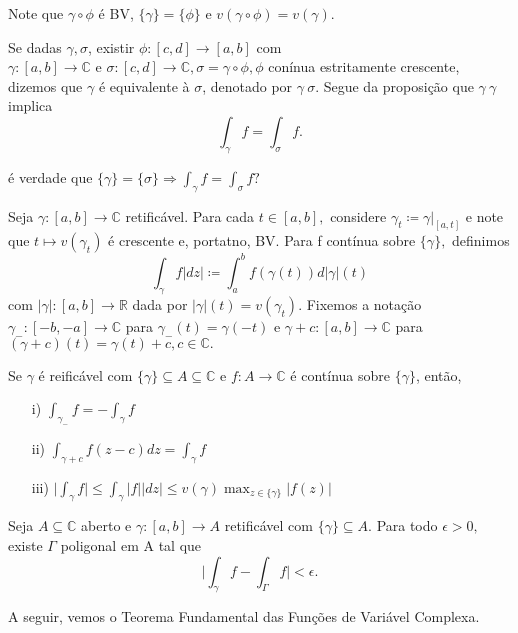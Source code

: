 \documentclass[ComplexAnalysis/complex.tex]{subfiles}
\begin{document}
\begin{proof*}
	\begin{exer*}
		Note que $\gamma\circ{\phi}$ é BV, $\{\gamma\}=\{\phi\} $ e $v(\gamma\circ{\phi}) = v(\gamma).$
	\end{exer*}
\end{proof*}
Se dadas $\gamma, \sigma$, existir $\phi:[c, d]\rightarrow [a, b]$ com $\gamma:[a, b]\rightarrow \mathbb{C}\text{ e }\sigma:[c, d]\rightarrow \mathbb{C},
	\sigma = \gamma\circ{\phi}, \phi$ conínua estritamente crescente, dizemos que $\gamma $ é equivalente à $\sigma$, denotado por $\gamma~\sigma.$
Segue da proposição que $\gamma~\gamma$ implica
$$
	\int_{\gamma}^{}f = \int_{\sigma}^{}f.
$$
\begin{exer*}
	é verdade que $\{\gamma\}=\{\sigma\}\Rightarrow \int_{\gamma}^{}f = \int_{\sigma}^{}f?$
\end{exer*}
Seja $\gamma:[a, b]\rightarrow \mathbb{C}$ retificável. Para cada $t\in{[a, b]},$ considere $\gamma_t\coloneqq \gamma|_[a, t]$ e
note que $t\mapsto{v(\gamma_t)}$ é crescente e, portatno, BV. Para f contínua sobre $\{\gamma\},$ definimos
$$
	\int_{\gamma}^{}f|dz|\coloneqq  \int_{a}^{b}f(\gamma(t))d|\gamma|(t)
$$
com $|\gamma|:[a, b]\rightarrow \mathbb{R}$ dada por $|\gamma|(t) = v(\gamma_t)$. Fixemos a notação $\gamma_{-}:[-b, -a]\rightarrow \mathbb{C}$
para $\gamma_{-}(t) = \gamma(-t)$ e $\gamma+c:[a, b]\rightarrow \mathbb{C}$ para $(\gamma + c)(t) = \gamma(t) + c, c\in \mathbb{C}.$
\begin{prop*}
	Se $\gamma$ é reificável com $\{\gamma\}\subseteq{A}\subseteq{\mathbb{C}} $ e $f:A\rightarrow \mathbb{C}$ é contínua sobre
	$\{\gamma\} $, então,
	\begin{itemize}
		\item[i)] $\int_{\gamma_{-}}^{}f = - \int_{\gamma}^{}f$
		\item[ii)] $\int_{\gamma+c}^{}f(z-c)dz = \int_{\gamma}^{}f$
		\item[iii)] $\biggl|\int_{\gamma}^{}f\biggr|\leq \int_{\gamma}^{}|f||dz|\leq v(\gamma)\max_{z\in \{\gamma\} }|f(z)|$
	\end{itemize}
\end{prop*}
\begin{lmm*}
	Seja $A\subseteq{\mathbb{C}}$ aberto e $\gamma:[a, b]\rightarrow A$ retificável com $\{\gamma\}\subseteq{A}$. Para todo $\epsilon > 0,$
	existe $\Gamma$ poligonal em A tal que
	$$
		\biggl|\int_{\gamma}^{}f - \int_{\Gamma}^{}f\biggr| < \epsilon.
	$$
\end{lmm*}
A seguir, vemos o Teorema Fundamental das Funções de Variável Complexa.
\end{document}
